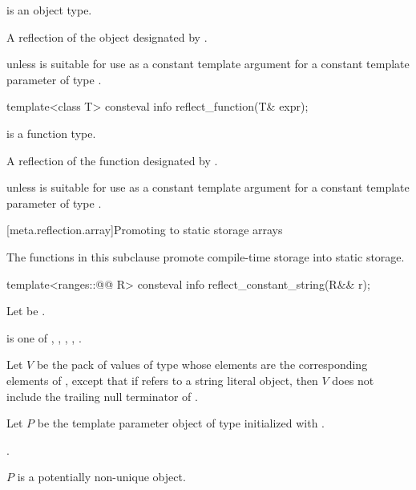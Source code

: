 \begin{itemdescr}
\pnum
\mandates
{} is an object type.

\pnum
\returns
A reflection of the object designated by .

\pnum
\throws
{} unless
 is suitable for use as a constant template argument
for a constant template parameter of type .
\end{itemdescr}

%
\begin{itemdecl}
template<class T>
  consteval info reflect_function(T& expr);
\end{itemdecl}

\begin{itemdescr}
\pnum
\mandates
{} is a function type.

\pnum
\returns
A reflection of the function designated by .

\pnum
\throws
{} unless
 is suitable for use as a constant template argument
for a constant template parameter of type .
\end{itemdescr}

[meta.reflection.array]{Promoting to static storage arrays}

\pnum
The functions in this subclause promote compile-time storage into static storage.

%
\begin{itemdecl}
template<ranges::@@ R>
  consteval info reflect_constant_string(R&& r);
\end{itemdecl}

\begin{itemdescr}
\pnum
Let  be .

\pnum
\mandates
{} is one of
,
,
,
,
.

\pnum
Let $V$ be the pack of values of type 
whose elements are the corresponding elements of ,
except that if  refers to a string literal object,
then $V$ does not include the trailing null terminator of .

\pnum
Let $P$ be the template parameter object
of type 
initialized with .

\pnum
\returns
{}.

\pnum
\begin{note}
$P$ is a potentially non-unique object.
\end{note}
\end{itemdescr}

